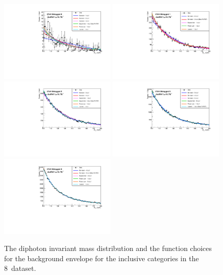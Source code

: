 \begin{figure}
  \includegraphics[width=0.49\textwidth]{analysis/plots/multipdf_plots/cat0_8TeV.pdf}
  \includegraphics[width=0.49\textwidth]{analysis/plots/multipdf_plots/cat1_8TeV.pdf}\\
  \includegraphics[width=0.49\textwidth]{analysis/plots/multipdf_plots/cat2_8TeV.pdf}
  \includegraphics[width=0.49\textwidth]{analysis/plots/multipdf_plots/cat3_8TeV.pdf}\\
  \includegraphics[width=0.49\textwidth]{analysis/plots/multipdf_plots/cat4_8TeV.pdf}
  \caption{The diphoton invariant mass distribution and the function choices for the background envelope for the inclusive categories in the 8~\TeV dataset.}
  \label{fig:multipdf4}
\end{figure}

